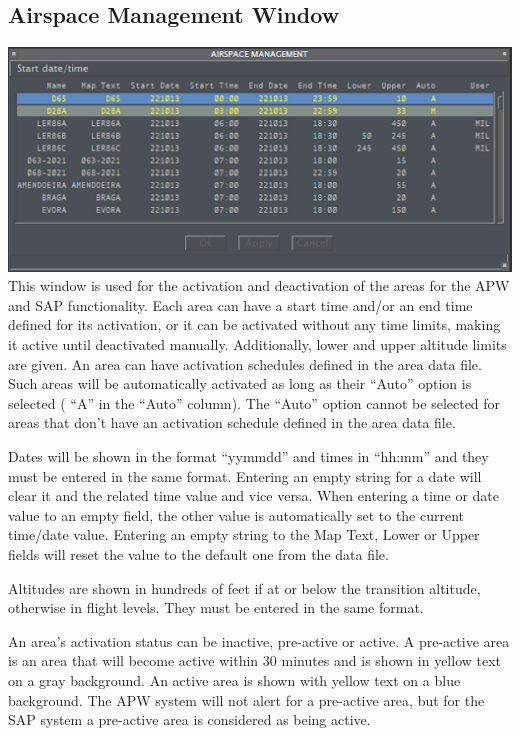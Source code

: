 \documentclass[11pt,a4paper,oldfontcommands]{memoir}
\begin{document}
\subsection{Airspace Management Window}
\label{menu:tsa}
\includegraphics{img/tsa.png}\\
This window is used for the activation and deactivation of the areas for the APW and SAP functionality. Each area can have a start time and/or an end time defined for its activation, or it can be activated without any time limits, making it active until deactivated manually. Additionally, lower and upper altitude limits are given. An area can have activation schedules defined in the area data file. Such areas will be automatically activated as long as their “Auto” option is selected ( “A” in the “Auto” column). The “Auto” option cannot be selected for areas that don’t have an activation schedule defined in the area data file.

Dates will be shown in the format “yymmdd” and times in “hh:mm” and they must be entered in the same format. Entering an empty string for a date will clear it and the related time value and vice versa. When entering a time or date value to an empty field, the other value is automatically set to the current time/date value. Entering an empty string to the Map Text, Lower or Upper fields will reset the value to the default one from the data file.

Altitudes are shown in hundreds of feet if at or below the transition altitude, otherwise in flight levels. They must be entered in the same format.

An area’s activation status can be inactive, pre-active or active. A pre-active area is an area that will become active within 30 minutes and is shown in yellow text on a gray background. An active area is shown with yellow text on a blue background. The APW system will not alert for a pre-active area, but for the SAP system a pre-active area is considered as being active.
\end{document}
